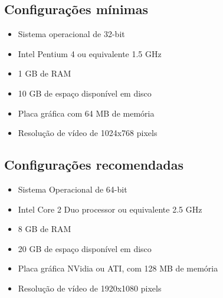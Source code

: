 \subsection{Configurações mínimas}
\begin{itemize}
	\item Sistema operacional de 32-bit
	\item Intel Pentium 4 ou equivalente 1.5 GHz
	\item 1 GB de RAM
	\item 10 GB de espaço disponível em disco
	\item Placa gráfica com 64 MB de memória
	\item Resolução de vídeo de 1024x768 pixels
\end{itemize}

\subsection{Configurações recomendadas}
\begin{itemize}
	\item Sistema Operacional de 64-bit
	\item Intel Core 2 Duo processor ou equivalente 2.5 GHz
	\item 8 GB de RAM
	\item 20 GB de espaço disponível em disco
	\item Placa gráfica NVidia ou ATI, com 128 MB de memória
	\item Resolução de vídeo de 1920x1080 pixels
\end{itemize}

